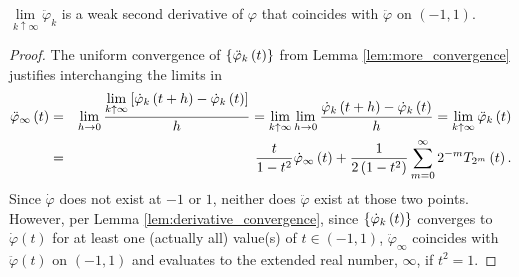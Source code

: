 \begin{lemma}
  \label{lem:weak_deriv_deriv}
  $\lim\limits_{k \uparrow \infty} \ddot{\varphi}_k$ is a weak second derivative of $\varphi$ that coincides with $\ddot{\varphi}$ on $\left(-1,1\right)$.
\end{lemma}
\begin{proof}
  The uniform convergence of $\{\ddotvarphi[t]{k}\}$ from Lemma \ref{lem:more_convergence} justifies interchanging the limits in
  \begin{eqnarray*}
  \ddotvarphi[t]{\infty} &=& \lim\limits_{h \rightarrow 0} \frac{\lim\limits_{k \uparrow \infty}\left[\dotvarphi[t + h]{k} - \dotvarphi[t]{k}\right]}{h} =
  \lim\limits_{k \uparrow \infty} \lim\limits_{h \rightarrow 0} \frac{\dotvarphi[t + h]{k} - \dotvarphi[t]{k}}{h} = \lim\limits_{k \uparrow \infty} \ddotvarphi[t]{k} \\
  &=& \frac{t}{1 - t^2} \dotvarphi[t]{\infty} + \frac{1}{2 \left(1 - t^2\right)} \sum\limits_{m = 0}^\infty 2^{-m} \TT[t]{m}.
  \end{eqnarray*}
  Since $\dot{\varphi}$ does not exist at $-1$ or $1$, neither does $\ddot{\varphi}$ exist at those two points. However, per Lemma \ref{lem:derivative_convergence}, since $\{\dotvarphi[t]{k}\}$ converges to $\dot{\varphi}\left(t\right)$ for at least one (actually all) value(s) of $t \in \left(-1,1\right)$, $\ddot{\varphi}_{\infty}$ coincides with $\ddot{\varphi}\left(t\right)$ on $\left(-1,1\right)$ and evaluates to the extended real number, $\infty$, if $t^2 = 1$.
\end{proof}

